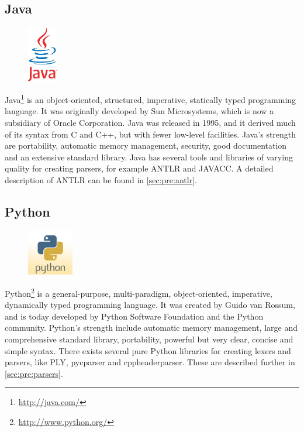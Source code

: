 \subsection{Java}
\label{sec:pre:java}
\begin{figure}
	\vspace{-30pt}
	\includegraphics[width=1.3cm]{./planning/img/java_logo}
	\vspace{-30pt}
\end{figure}
Java\footnote{\url{http://java.com/}} is an object-oriented, structured,
imperative, statically typed programming language. It was originally developed
by Sun Microsystems, which is now a subsidiary of Oracle Corporation. Java was
released in 1995, and it derived much of its syntax from C and C++, but with
fewer low-level facilities. Java’s strength are portability, automatic memory
management, security, good documentation and an extensive standard library.
Java has several tools and libraries of varying quality for creating parsers,
for example ANTLR and JAVACC. A detailed description of ANTLR can be found in 
\autoref{sec:pre:antlr}.

\subsection{Python}
\label{sec:pre:python}
\begin{figure}
	\vspace{-20pt}
	\includegraphics[width=2cm]{./planning/img/python_logo}
	\vspace{-20pt}
\end{figure}
Python\footnote{\url{http://www.python.org/}} is a general-purpose,
multi-paradigm, object-oriented, imperative, dynamically typed programming
language. It was created by Guido van Rossum, and is today developed by Python
Software Foundation and the Python community. Python’s strength include
automatic memory management, large and comprehensive standard library,
portability, powerful but very clear, concise and simple syntax. There exists
several pure Python libraries for creating lexers and parsers, like PLY,
pycparser and cppheaderparser. These are described further in
\autoref{sec:pre:parsers}.


